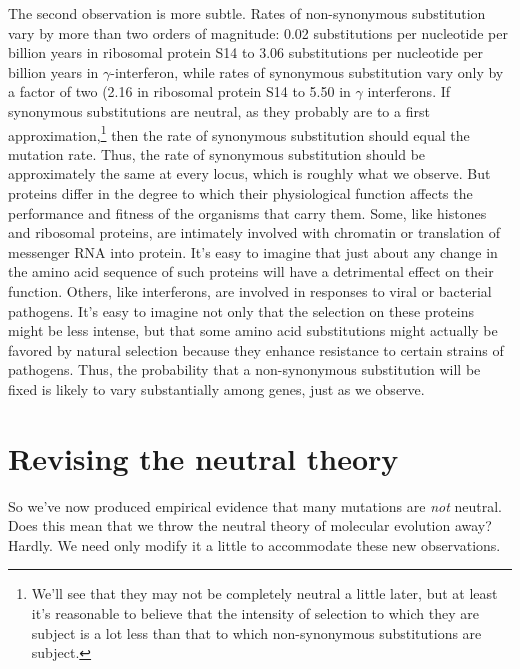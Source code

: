 \documentclass[12pt]{article}
\begin{document}
The second observation is more subtle. Rates of non-synonymous
substitution vary by more than two orders of magnitude: 0.02
substitutions per nucleotide per billion years in ribosomal protein
S14 to 3.06 substitutions per nucleotide per billion years in
$\gamma$-interferon, while rates of synonymous substitution vary only
by a factor of two (2.16 in ribosomal protein S14 to 5.50 in $\gamma$
interferons. If synonymous substitutions are neutral, as they probably
are to a first approximation,\footnote{We'll see that they may not be
  completely neutral a little later, but at least it's reasonable to
  believe that the intensity of selection to which they are subject is
  a lot less than that to which non-synonymous substitutions are
  subject.}  then the rate of synonymous substitution should equal the
mutation rate. Thus, the rate of synonymous substitution should be
approximately the same at every locus, which is roughly what we
observe. But proteins differ in the degree to which their
physiological function affects the performance and fitness of the
organisms that carry them. Some, like histones and ribosomal proteins,
are intimately involved with chromatin or translation of messenger RNA
into protein. It's easy to imagine that just about any change in the
amino acid sequence of such proteins will have a detrimental effect on
their function. Others, like interferons, are involved in responses to
viral or bacterial pathogens. It's easy to imagine not only that the
selection on these proteins might be less intense, but that some amino
acid substitutions might actually be favored by natural selection
because they enhance resistance to certain strains of pathogens. Thus,
the probability that a non-synonymous substitution will be fixed is
likely to vary substantially among genes, just as we observe.

\section*{Revising the neutral theory}

So we've now produced empirical evidence that many mutations are {\it
  not\/} neutral. Does this mean that we throw the neutral theory of
molecular evolution away? Hardly. We need only modify it a little to
accommodate these new observations.
\end{document}
